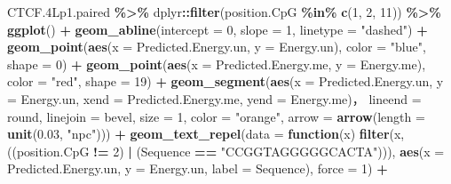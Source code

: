 \documentclass[
]{article}
\newenvironment{Shaded}{\begin{snugshade}}{\end{snugshade}}
\newcommand{\ControlFlowTok}[1]{\textcolor[rgb]{0.13,0.29,0.53}{\textbf{#1}}}
\newcommand{\DataTypeTok}[1]{\textcolor[rgb]{0.13,0.29,0.53}{#1}}
\newcommand{\DecValTok}[1]{\textcolor[rgb]{0.00,0.00,0.81}{#1}}
\newcommand{\FloatTok}[1]{\textcolor[rgb]{0.00,0.00,0.81}{#1}}
\newcommand{\KeywordTok}[1]{\textcolor[rgb]{0.13,0.29,0.53}{\textbf{#1}}}
\newcommand{\NormalTok}[1]{#1}
\newcommand{\OperatorTok}[1]{\textcolor[rgb]{0.81,0.36,0.00}{\textbf{#1}}}
\newcommand{\StringTok}[1]{\textcolor[rgb]{0.31,0.60,0.02}{#1}}
\begin{document}
\begin{Shaded}
\begin{Highlighting}[]
\NormalTok{CTCF}\FloatTok{.4}\NormalTok{Lp1.paired }\OperatorTok{\%\textgreater{}\%}
\StringTok{    }\NormalTok{dplyr}\OperatorTok{::}\KeywordTok{filter}\NormalTok{(position.CpG }\OperatorTok{\%in\%}\StringTok{ }\KeywordTok{c}\NormalTok{(}\DecValTok{1}\NormalTok{, }\DecValTok{2}\NormalTok{, }\DecValTok{11}\NormalTok{)) }\OperatorTok{\%\textgreater{}\%}
\StringTok{    }\KeywordTok{ggplot}\NormalTok{() }\OperatorTok{+}
\StringTok{    }\KeywordTok{geom\_abline}\NormalTok{(}\DataTypeTok{intercept =} \DecValTok{0}\NormalTok{, }\DataTypeTok{slope =} \DecValTok{1}\NormalTok{, }\DataTypeTok{linetype =} \StringTok{"dashed"}\NormalTok{) }\OperatorTok{+}
\StringTok{    }\KeywordTok{geom\_point}\NormalTok{(}\KeywordTok{aes}\NormalTok{(}\DataTypeTok{x =}\NormalTok{ Predicted.Energy.un, }\DataTypeTok{y =}\NormalTok{ Energy.un), }\DataTypeTok{color =} \StringTok{"blue"}\NormalTok{, }\DataTypeTok{shape =} \DecValTok{0}\NormalTok{) }\OperatorTok{+}
\StringTok{    }\KeywordTok{geom\_point}\NormalTok{(}\KeywordTok{aes}\NormalTok{(}\DataTypeTok{x =}\NormalTok{ Predicted.Energy.me, }\DataTypeTok{y =}\NormalTok{ Energy.me), }\DataTypeTok{color =} \StringTok{"red"}\NormalTok{, }\DataTypeTok{shape =} \DecValTok{19}\NormalTok{) }\OperatorTok{+}
\StringTok{    }\KeywordTok{geom\_segment}\NormalTok{(}\KeywordTok{aes}\NormalTok{(}\DataTypeTok{x =}\NormalTok{ Predicted.Energy.un, }\DataTypeTok{y =}\NormalTok{ Energy.un,}
                     \DataTypeTok{xend =}\NormalTok{ Predicted.Energy.me, }\DataTypeTok{yend =}\NormalTok{ Energy.me)，}
                 \DataTypeTok{lineend =} \StringTok{\textquotesingle{}round\textquotesingle{}}\NormalTok{, }\DataTypeTok{linejoin =} \StringTok{\textquotesingle{}bevel\textquotesingle{}}\NormalTok{, }\DataTypeTok{size =} \DecValTok{1}\NormalTok{, }\DataTypeTok{color =} \StringTok{"orange"}\NormalTok{,}
                 \DataTypeTok{arrow =} \KeywordTok{arrow}\NormalTok{(}\DataTypeTok{length =} \KeywordTok{unit}\NormalTok{(}\FloatTok{0.03}\NormalTok{, }\StringTok{"npc"}\NormalTok{))) }\OperatorTok{+}
\StringTok{    }\KeywordTok{geom\_text\_repel}\NormalTok{(}\DataTypeTok{data =} \ControlFlowTok{function}\NormalTok{(x) }\KeywordTok{filter}\NormalTok{(x, ((position.CpG }\OperatorTok{!=}\StringTok{ }\DecValTok{2}\NormalTok{) }\OperatorTok{|}\StringTok{ }\NormalTok{(Sequence }\OperatorTok{==}\StringTok{ "CCGGTAGGGGGCACTA"}\NormalTok{))),}
                    \KeywordTok{aes}\NormalTok{(}\DataTypeTok{x =}\NormalTok{ Predicted.Energy.un, }\DataTypeTok{y =}\NormalTok{ Energy.un, }\DataTypeTok{label =}\NormalTok{ Sequence), }\DataTypeTok{force =} \DecValTok{1}\NormalTok{) }\OperatorTok{+}

\end{Highlighting}
\end{Shaded}
\end{document}
